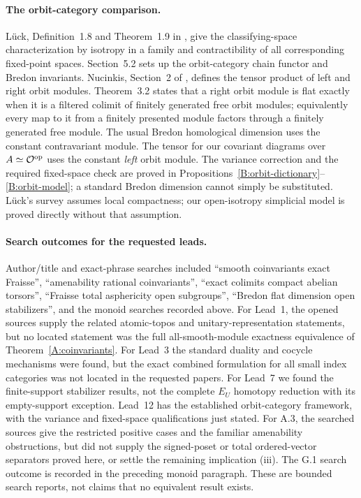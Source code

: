 \paragraph{The orbit-category comparison.}
L\"uck, Definition~1.8 and Theorem~1.9 in \cite{ABLueck2005}, give
the classifying-space characterization by isotropy in a family and
contractibility of all corresponding fixed-point spaces. Section~5.2
sets up the orbit-category chain functor and Bredon invariants.
Nucinkis, Section~2 of \cite{ABNucinkis2004}, defines the tensor
product of left and right orbit modules. Theorem~3.2 states that a
right orbit module is flat exactly when it is a filtered colimit of
finitely generated free orbit modules; equivalently every map to it
from a finitely presented module factors through a finitely generated
free module.
The usual Bredon homological dimension uses the constant
contravariant module. The tensor for our covariant diagrams over
$A\simeq\mathcal O^{\mathrm{op}}$ uses the constant \emph{left} orbit module.
The variance correction and the required fixed-space check are
proved in Propositions~\ref{B:orbit-dictionary}--\ref{B:orbit-model};
a standard Bredon dimension cannot simply be substituted.
L\"uck's survey assumes local compactness; our open-isotropy
simplicial model is proved directly without that assumption.





\paragraph{Search outcomes for the requested leads.}
Author/title and exact-phrase searches included ``smooth
coinvariants exact Fraisse'', ``amenability rational coinvariants'',
``exact colimits compact abelian torsors'', ``Fraisse total
asphericity open subgroups'', ``Bredon flat dimension open
stabilizers'', and the monoid searches recorded above.
For Lead~1, the opened sources supply the related atomic-topos and
unitary-representation statements, but no located statement was
the full all-smooth-module exactness equivalence of
Theorem~\ref{A:coinvariants}. For Lead~3 the standard duality and
cocycle mechanisms were found, but the exact combined formulation
for all small index categories was not located in the requested
papers. For Lead~7 we found the finite-support stabilizer results,
not the complete $E_U$ homotopy reduction with its empty-support
exception. Lead~12 has the established orbit-category framework,
with the variance and fixed-space qualifications just stated.
For A.3, the searched sources give the restricted positive cases
and the familiar amenability obstructions, but did not supply the
signed-poset or total ordered-vector separators proved here, or
settle the remaining implication (iii). The G.1 search outcome is
recorded in the preceding monoid paragraph. These are bounded
search reports, not claims that no equivalent result exists.
